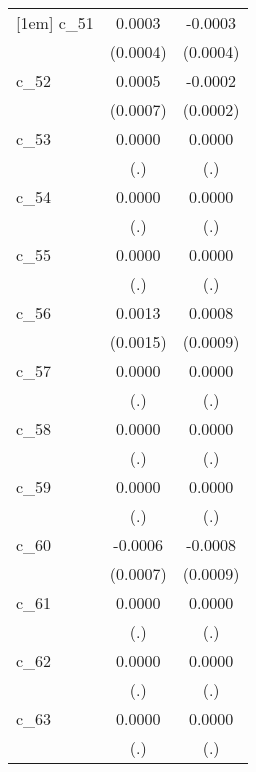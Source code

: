 {\begin{tabular}{l*{2}{c}}
[1em]
c\_51        &      0.0003        &     -0.0003        \\
            &    (0.0004)        &    (0.0004)        \\
[1em]
c\_52        &      0.0005        &     -0.0002        \\
            &    (0.0007)        &    (0.0002)        \\
[1em]
c\_53        &      0.0000        &      0.0000        \\
            &         (.)        &         (.)        \\
[1em]
c\_54        &      0.0000        &      0.0000        \\
            &         (.)        &         (.)        \\
[1em]
c\_55        &      0.0000        &      0.0000        \\
            &         (.)        &         (.)        \\
[1em]
c\_56        &      0.0013        &      0.0008        \\
            &    (0.0015)        &    (0.0009)        \\
[1em]
c\_57        &      0.0000        &      0.0000        \\
            &         (.)        &         (.)        \\
[1em]
c\_58        &      0.0000        &      0.0000        \\
            &         (.)        &         (.)        \\
[1em]
c\_59        &      0.0000        &      0.0000        \\
            &         (.)        &         (.)        \\
[1em]
c\_60        &     -0.0006        &     -0.0008        \\
            &    (0.0007)        &    (0.0009)        \\
[1em]
c\_61        &      0.0000        &      0.0000        \\
            &         (.)        &         (.)        \\
[1em]
c\_62        &      0.0000        &      0.0000        \\
            &         (.)        &         (.)        \\
[1em]
c\_63        &      0.0000        &      0.0000        \\
            &         (.)        &         (.)        \\

\end{tabular}}
